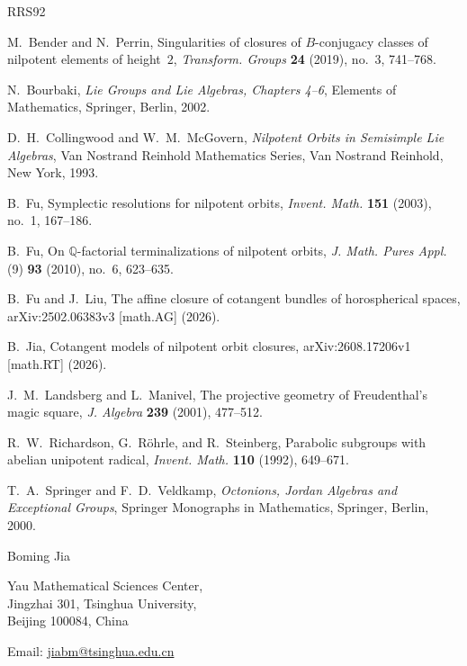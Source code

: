 \documentclass[12pt]{article}
\theoremstyle{definition}
\begin{document}
{\small
\begin{thebibliography}{RRS92}

M.~Bender and N.~Perrin,
Singularities of closures of \(B\)-conjugacy classes of nilpotent
elements of height~\(2\),
\emph{Transform. Groups} \textbf{24} (2019), no.~3, 741--768.

N.~Bourbaki,
\emph{Lie Groups and Lie Algebras, Chapters 4--6},
Elements of Mathematics, Springer, Berlin, 2002.

D.~H.~Collingwood and W.~M.~McGovern,
\emph{Nilpotent Orbits in Semisimple Lie Algebras},
Van Nostrand Reinhold Mathematics Series,
Van Nostrand Reinhold, New York, 1993.

B.~Fu,
Symplectic resolutions for nilpotent orbits,
\emph{Invent. Math.} \textbf{151} (2003), no.~1, 167--186.

B.~Fu,
On \(\mathbb Q\)-factorial terminalizations of nilpotent orbits,
\emph{J. Math. Pures Appl.} (9) \textbf{93} (2010), no.~6,
623--635.

B.~Fu and J.~Liu,
The affine closure of cotangent bundles of horospherical spaces,
arXiv:2502.06383v3 [math.AG] (2026).

B.~Jia,
Cotangent models of nilpotent orbit closures,
arXiv:2608.17206v1 [math.RT] (2026).

J.~M.~Landsberg and L.~Manivel,
The projective geometry of Freudenthal's magic square,
\emph{J. Algebra} \textbf{239} (2001), 477--512.

R.~W.~Richardson, G.~R\"ohrle, and R.~Steinberg,
Parabolic subgroups with abelian unipotent radical,
\emph{Invent. Math.} \textbf{110} (1992), 649--671.

T.~A.~Springer and F.~D.~Veldkamp,
\emph{Octonions, Jordan Algebras and Exceptional Groups},
Springer Monographs in Mathematics, Springer, Berlin, 2000.

\end{thebibliography}
}

\bigskip
\noindent
Boming Jia

\noindent
Yau Mathematical Sciences Center,\\
Jingzhai 301, Tsinghua University,\\
Beijing 100084, China

\noindent
Email: \href{mailto:jiabm@tsinghua.edu.cn}{jiabm@tsinghua.edu.cn}
\end{document}
